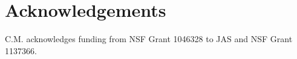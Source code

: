 \section{Acknowledgements}
C.M. acknowledges funding from NSF Grant 1046328 to JAS and NSF Grant 1137366. 





\newpage